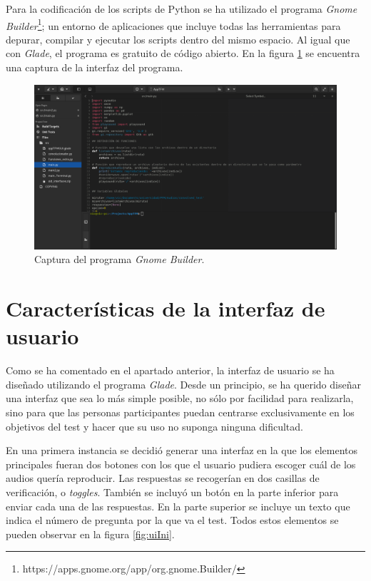 \documentclass[11pt,a4paper]{book}
\begin{document}
           \newpage

           Para la codificación de los scripts de Python se ha utilizado el programa \textit{Gnome Builder}\footnote{https://apps.gnome.org/app/org.gnome.Builder/}; un entorno de aplicaciones que incluye todas las herramientas para depurar, compilar y ejecutar los scripts dentro del mismo espacio. Al igual que con \textit{Glade}, el programa es gratuito de código abierto. En la figura \ref{fig:builderIni} se encuentra una captura de la interfaz del programa.
           
            \begin{figure}[H]
                \begin{center}
                    \includegraphics[scale=.2]{../imagenes/builderIni.png}
                    \caption{Captura del programa \textit{Gnome Builder}.}
                    \label{fig:builderIni}
                \end{center}
            \end{figure}
            
        \section{Características de la interfaz de usuario}
            Como se ha comentado en el apartado anterior, la interfaz de usuario se ha diseñado utilizando el programa \textit{Glade}. Desde un principio, se ha querido diseñar una interfaz que sea lo más simple posible, no sólo por facilidad para realizarla, sino para que las personas participantes puedan centrarse exclusivamente en los objetivos del test y hacer que su uso no suponga ninguna dificultad.  
            
            En una primera instancia se decidió generar una interfaz en la que los elementos principales fueran dos botones con los que el usuario pudiera escoger cuál de los audios quería reproducir. Las respuestas se recogerían en dos casillas de verificación, o \textit{toggles}. También se incluyó un botón en la parte inferior para enviar cada una de las respuestas. En la parte superior se incluye un texto que indica el número de pregunta por la que va el test. Todos estos elementos se pueden observar en la figura \ref{fig:uiIni}.
            
\end{document}
